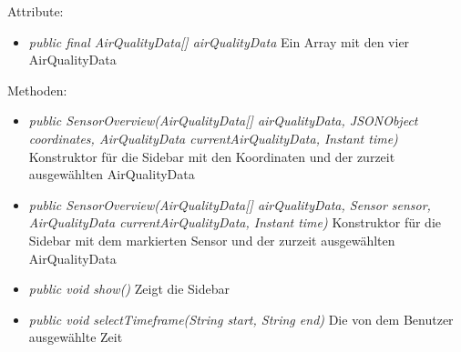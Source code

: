 Attribute:
\begin{itemize}
    \item \emph{public final AirQualityData[] airQualityData} Ein Array mit den vier AirQualityData
\end{itemize}
Methoden:
\begin{itemize}
    \item \emph{public SensorOverview(AirQualityData[] airQualityData, JSONObject coordinates, AirQualityData currentAirQualityData, Instant time)} Konstruktor für die Sidebar mit den Koordinaten und der zurzeit ausgewählten AirQualityData
    \item \emph{public SensorOverview(AirQualityData[] airQualityData, Sensor sensor, AirQualityData currentAirQualityData, Instant time)} Konstruktor für die Sidebar mit dem markierten Sensor und der zurzeit ausgewählten AirQualityData
    \item \emph{public void show()} Zeigt die Sidebar
    \item \emph{public void selectTimeframe(String start, String end)} Die von dem Benutzer ausgewählte Zeit
\end{itemize}
